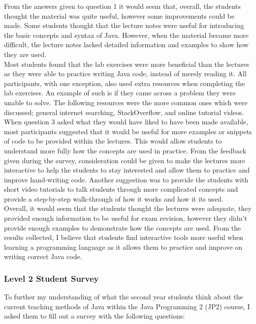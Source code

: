 \documentclass{article}
\begin{document}
From the answers given to question 1 it would seem that, overall, the students thought the material was quite useful, however some improvements could be made. Some students thought that the lecture notes were useful for introducing the basic concepts and syntax of Java. However, when the material became more difficult, the lecture notes lacked detailed information and examples to show how they are used.\\

Most students found that the lab exercises were more beneficial than the lectures as they were able to practice writing Java code, instead of merely reading it. All participants, with one exception, also used extra resources when completing the lab exercises. An example of such is if they came across a problem they were unable to solve. The following resources were the more common ones which were discussed; general internet searching, StackOverflow, and online tutorial videos.\\

When question 3 asked what they would have liked to have been made available, most participants suggested that it would be useful for more examples or snippets of code to be provided within the lectures. This would allow students to understand more fully how the concepts are used in practice. From the feedback given during the survey, consideration could be given to make the lectures more interactive to help the students to stay interested and allow them to practice and improve hand-writing code. Another suggestion was to provide the students with short video tutorials to talk students through more complicated concepts and provide a step-by-step walk-through of how it works and how it its used.\\

Overall, it would seem that the students thought the lectures were adequate, they provided enough information to be useful for exam revision, however they didn't provide enough examples to demonstrate how the concepts are used. From the results collected, I believe that students find interactive tools more useful when learning a programming language as it allows them to practice and improve on writing correct Java code.\\

\subsubsection{Level 2 Student Survey}

To further my understanding of what the second year students think about the current teaching methods of Java within the Java Programming 2 (JP2) course, I asked them to fill out a survey with the following questions:
\end{document}
